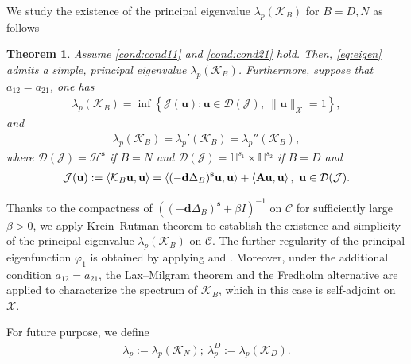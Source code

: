 \documentclass[a4paper,11pt]{amsart}
\newtheorem{theorem}{Theorem}
\theoremstyle{definition}
\numberwithin{equation}{section}
\theoremstyle{definition}
\begin{document}
We study the existence of the principal eigenvalue $\lambda_p\left(\mathcal{K}_B\right)$ for $B=D,N$ as follows

\begin{theorem}\label{eigen_theo}
Assume \ref{cond:cond11} and \ref{cond:cond21} hold. Then, \eqref{eq:eigen} admits a simple, principal eigenvalue $\lambda_p\left(\mathcal{K}_B\right)$. Furthermore, suppose that $a_{12}=a_{21}$, one has
\begin{align*}
\lambda_p\left(\mathcal{K}_B\right)=\inf\left\{ \mathcal{J}(\textbf{u}):\textbf{u}\in \mathcal{D}(\mathcal{J}),~\|\textbf{u}\|_{\mathcal{X}}=1\right\},
\end{align*}
and
\begin{align*}
\lambda_p\left(\mathcal{K}_B\right)=\lambda_p'(\mathcal{K}_B)=\lambda_p''(\mathcal{K}_B),
\end{align*}
where $\mathcal{D}(\mathcal{J})=\mathcal{H}^{\textbf{s}}$ if $B=N$ and $\mathcal{D}(\mathcal{J})=\mathbb{H}^{s_1}\times\mathbb{H}^{s_2}$ if $B=D$ and
\begin{align*}
\mathcal{J}(\textbf{u}):=\left<\mathcal{K}_B{\bf u},{\bf u}\right> =\left<(-{\bf d}\Delta_B)^{\textbf{s}}{\bf u},{\bf u}\right> + \left<{\bf Au},{\bf u}\right>,~{\bf u}\in \mathcal{D}(\mathcal{J}).
\end{align*}

\end{theorem}

Thanks to the compactness of $((-\textbf{d}\Delta_B)^{\textbf{s}} + \beta I)^{-1}$ on $\mathcal{C}$ for sufficiently large $\beta > 0$, we apply Krein--Rutman theorem to establish the existence and simplicity of the principal eigenvalue $\lambda_p(\mathcal{K}_B)$ on $\mathcal{C}$. The further regularity of the principal eigenfunction $\varphi_1$ is obtained by applying \cite[Theorem~4.1]{grubb_regularity_2016} and \cite[Corollary~2.2]{zhao_spatiotemporal_2025}. Moreover, under the additional condition $a_{12} = a_{21}$, the Lax–Milgram theorem and the Fredholm alternative are applied to characterize the spectrum of $\mathcal{K}_B$, which in this case is self-adjoint on $\mathcal{X}$.



For future purpose, we define 
\begin{align*}
\lambda_p:=\lambda_p\left(\mathcal{K}_N\right);~\lambda_p^D:=\lambda_p\left(\mathcal{K}_D\right).
\end{align*}
\end{document}
